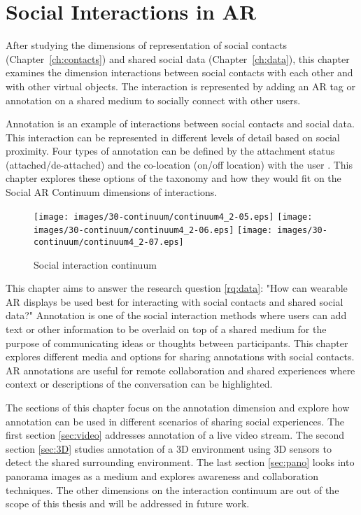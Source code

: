 \chapter{Social Interactions in AR}
\label{ch:annotation}

After studying the dimensions of representation of social contacts (Chapter~\ref{ch:contacts}) and shared social data (Chapter~\ref{ch:data}), this chapter examines the dimension interactions between social contacts with each other and with other virtual objects. The interaction is represented by adding an AR tag or annotation on a shared medium to socially connect with other users.

Annotation is an example of interactions between social contacts and social data. This interaction can be represented in different levels of detail based on social proximity. Four types of annotation can be defined by the attachment status (attached/de-attached) and the co-location (on/off location) with the user \cite{Hansen2006}. This chapter explores these options of the taxonomy and how they would fit on the Social AR Continuum dimensions of interactions. 

\begin{figure}[h]
  \centering
  \texttt{[image: images/30-continuum/continuum4\_2-05.eps]}
  \texttt{[image: images/30-continuum/continuum4\_2-06.eps]}
  \texttt{[image: images/30-continuum/continuum4\_2-07.eps]}
  \caption{Social interaction continuum}
  \label{fig:interaction:interaction-continuum}
\end{figure}

This chapter aims to answer the research question \ref{rq:data}: "How can wearable AR displays be used best for interacting with social contacts and shared social data?"
Annotation is one of the social interaction methods where users can add text or other information to be overlaid on top of a shared medium for the purpose of communicating ideas or thoughts between participants. This chapter explores different media and options for sharing annotations with social contacts. AR annotations are useful for remote collaboration and shared experiences where context or descriptions of the conversation can be highlighted.

The sections of this chapter focus on the annotation dimension and explore how annotation can be used in different scenarios of sharing social experiences. The first section \ref{sec:video} addresses annotation of a live video stream. The second section \ref{sec:3D} studies annotation of a 3D environment using 3D sensors to detect the shared surrounding environment. The last section \ref{sec:pano} looks into panorama images as a medium and explores awareness and collaboration techniques. The other dimensions on the interaction continuum are out of the scope of this thesis and will be addressed in future work. 





